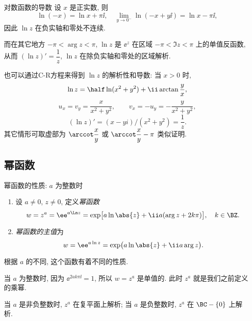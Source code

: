 \begin{frame}{对数函数的导数}
\beqskip{1pt}
	\onslide<+->
	设 $x$ 是正实数, 
	\onslide<+->
	则
	\[\ln (-x)=\ln x+\pi\ii,\quad
	\lim_{y\to0^-}\ln (-x+y\ii)=\ln x-\pi\ii,
	\]
	\onslide<+->
	因此 $\ln z$ 在负实轴和零处不连续.

	\onslide<+->
	而在其它地方 $-\pi<\arg z<\pi$, $\ln z$ 是 $\ee^z$ 在区域 $-\pi<\Im z<\pi$ 上的单值反函数, 
	\onslide<+->
	从而
	\alert{$(\ln z)'=\dfrac 1z$},
	\alert{$\ln z$ 在除负实轴和零处的区域解析}.

	\onslide<+->
	也可以通过C-R方程来得到 $\ln z$ 的解析性和导数: 当 $x>0$ 时,
	\[\ln z=\half \ln(x^2+y^2)+\ii\arctan \frac yx,
	\]
	\onslide<+->
	\[u_x=v_y=\frac x{x^2+y^2},\qquad v_x=-u_y=-\frac y{x^2+y^2},
	\]
	\[(\ln z)'=(x-yi)/(x^2+y^2)=\frac 1z.
	\]
	其它情形可取虚部为 $\arccot\dfrac xy$ 或 $\arccot\dfrac xy-\pi$ 类似证明.
\endgroup
\end{frame}


\subsection{幂函数}

\begin{frame}{幂函数的性质: $a$ 为整数时}
	\onslide<+->
	\begin{definition}[][幂函数]
		\begin{enumerate}
			\item 设 $a\neq 0$, $z\neq 0$, 定义\emph{幂函数}
			\[w=z^a=\ee^{a\Ln z}
			=\exp\bigl[a\ln\abs{z}+\ii a(\arg z+2k\pi)\bigr],\quad k\in\BZ.
	\]
			\item \emph{幂函数的主值}为
			\[w=\ee^{a\ln z}=\exp\bigl(a\ln\abs{z}+\ii a\arg z\bigr).
	\]
		\end{enumerate}
		\vspace{-\baselineskip}
	\end{definition}
	\onslide<+->
	根据 $a$ 的不同, 这个函数有着不同的性质.

	\onslide<+->
	当 $a$ 为整数时, 因为 $\ee^{2ak\pi\ii}=1$, 所以 $w=z^a$ 是单值的.
	\onslide<+->
	此时 $z^a$ 就是我们之前定义的乘幂.

	\onslide<+->
	当 $a$ 是非负整数时, $z^a$ 在复平面上解析;
	\onslide<+->
	当 $a$ 是负整数时, $z^a$ 在 $\BC-\{0\}$ 上解析.
\end{frame}


